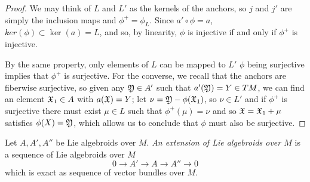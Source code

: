 \begin{proof}
We may think of $L$ and $L'$ as the kernels of the anchors, so $j$ and $j'$ are simply the inclusion maps and $\phi^+ = \phi_L$. Since $a' \circ \phi = a$, $ker(\phi) \subset \ker(a) = L$, and so, by linearity, $\phi$ is injective if and only if $\phi^+$ is injective.

By the same property, only elements of $L$ can be mapped to $L'$ $\phi$ being surjective implies that $\phi^+$ is surjective. For the converse, we recall that the anchors are fiberwise surjective, so given any $\mathfrak{Y} \in A'$ such that $a'(\mathfrak{Y}) = Y \in TM$, we can find an element $\mathfrak{X}_1 \in A$ with $a(\mathfrak{X}) = Y$; let $\nu = \oid Y - \phi(\oid X_1)$, so $\nu \in L'$ and if $\phi^+$ is surjective there must exist $\mu \in L$ such that $\phi^+(\mu) = \nu$ and so $\mathfrak{X} = \mathfrak{X}_1 + \mu$ satisfies $\phi(X) = \oid Y$, which allows us to conclude that $\phi$ must also be surjective.
\end{proof}


\linea

\begin{definition} 
Let $A, A', A''$ be Lie algebroids over $M$. \emph{An extension of Lie algebroids over $M$} is a sequence of Lie algebroids over $M$ \[ 0 \to A' \to A \to A'' \to 0 \] which is exact as sequence of vector bundles over $M$.
\end{definition}










